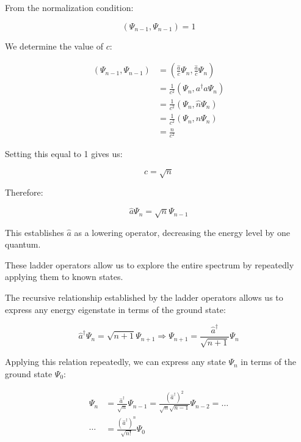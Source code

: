 \documentclass[10pt]{article}
\begin{document}
From the normalization condition:

\begin{equation*}
(\Psi_{n-1}, \Psi_{n-1}) = 1 \tag{5.32}
\end{equation*}

We determine the value of $c$:

\begin{align*}
(\Psi_{n-1}, \Psi_{n-1}) &= \left(\frac{\hat{a}}{c}\Psi_n, \frac{\hat{a}}{c}\Psi_n\right) \\
&= \frac{1}{c^2}(\Psi_n, a^\dagger a\Psi_n) \\
&= \frac{1}{c^2}(\Psi_n, \hat{n}\Psi_n) \tag{5.33} \\
&= \frac{1}{c^2}(\Psi_n, n\Psi_n) \\
&= \frac{n}{c^2}
\end{align*}

Setting this equal to 1 gives us:

\begin{equation*}
c = \sqrt{n} \tag{5.34}
\end{equation*}

Therefore:

\begin{equation*}
\hat{a}\Psi_n = \sqrt{n}\Psi_{n-1} \tag{5.35}
\end{equation*}

This establishes $\hat{a}$ as a lowering operator, decreasing the energy level by one quantum.

These ladder operators allow us to explore the entire spectrum by repeatedly applying them to known states.


The recursive relationship established by the ladder operators allows us to express any energy eigenstate in terms of the ground state:

\begin{equation*}
\hat{a}^\dagger\Psi_n = \sqrt{n+1}\Psi_{n+1} \Longrightarrow \Psi_{n+1} = \frac{\hat{a}^\dagger}{\sqrt{n+1}}\Psi_n \tag{5.36}
\end{equation*}

Applying this relation repeatedly, we can express any state $\Psi_n$ in terms of the ground state $\Psi_0$:

\begin{align*}
\Psi_n &= \frac{\hat{a}^\dagger}{\sqrt{n}}\Psi_{n-1} = \frac{(\hat{a}^\dagger)^2}{\sqrt{n}\sqrt{n-1}}\Psi_{n-2} = \ldots \tag{5.37} \\
\cdots &= \frac{(\hat{a}^\dagger)^n}{\sqrt{n!}}\Psi_0
\end{align*}
\end{document}
